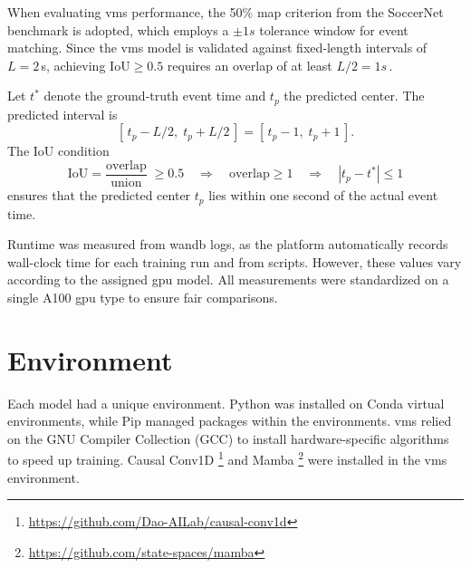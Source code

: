 When evaluating \acrshort{vms} performance, the 50\% \acrshort{map} criterion from the SoccerNet benchmark is adopted, which employs a $\pm1s$ tolerance window for event matching. Since the \acrshort{vms} model is validated against fixed‐length intervals of $L = 2\,$s, achieving $\mathrm{IoU}\ge0.5$ requires an overlap of at least $L/2 = 1s\,$.

Let $t^*$ denote the ground‐truth event time and $t_p$ the predicted center. The predicted interval is
\[
    [\,t_p - L/2,\;t_p + L/2\,]
    = [\,t_p - 1,\;t_p + 1\,].
\] 
The IoU condition
\[
    \mathrm{IoU}
    = \frac{\text{overlap}}{\text{union}}
    \;\ge0.5
    \quad\Longrightarrow\quad
    \text{overlap}\ge1
    \quad\Longrightarrow\quad
    |t_p - t^*|\le1
\]
ensures that the predicted center $t_p$ lies within one second of the actual event time.

Runtime was measured from \acrshort{wandb} logs, as the platform automatically records wall-clock time for each training run and from scripts. However, these values vary according to the assigned \acrshort{gpu} model. All measurements were standardized on a single A100 \acrshort{gpu} type to ensure fair comparisons. 

\section{Environment} 

Each model had a unique environment. Python was installed on Conda virtual environments, while Pip managed packages within the environments. \acrshort{vms} relied on the GNU Compiler Collection (GCC) to install hardware-specific algorithms to speed up training. Causal Conv1D \footnote{\url{https://github.com/Dao-AILab/causal-conv1d}} and Mamba \footnote{\url{https://github.com/state-spaces/mamba}}  were installed in the \acrshort{vms} environment.